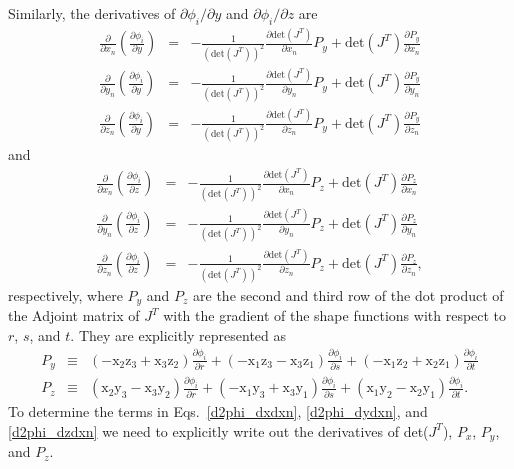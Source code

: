 Similarly, the derivatives of $\partial \phi_i/\partial y$ and $\partial \phi_i/ \partial z$ are 
%
\begin{eqnarray}
\frac{\partial}{\partial x_n} \left( \frac{\partial \phi_i}{\partial y} \right) &=&  -\frac{1}{(\text{det}(J^T))^2} \frac{\partial \text{det}(J^T)}{\partial x_n} P_y + \text{det}(J^T) \frac{\partial P_y}{\partial x_n}\nonumber\\
\frac{\partial}{\partial y_n} \left( \frac{\partial \phi_i}{\partial y} \right) &=& -\frac{1}{(\text{det}(J^T))^2} \frac{\partial \text{det}(J^T)}{\partial y_n} P_y + \text{det}(J^T) \frac{\partial P_y}{\partial y_n} \nonumber\\
\frac{\partial}{\partial z_n} \left( \frac{\partial \phi_i}{\partial y} \right) &=& -\frac{1}{(\text{det}(J^T))^2} \frac{\partial \text{det}(J^T)}{\partial z_n} P_y + \text{det}(J^T) \frac{\partial P_y}{\partial z_n} 
\label{d2phi_dydxn}
\end{eqnarray}
%
and
%
\begin{eqnarray}
\frac{\partial}{\partial x_n} \left( \frac{\partial \phi_i}{\partial z} \right) &=&  -\frac{1}{(\text{det}(J^T))^2} \frac{\partial \text{det}(J^T)}{\partial x_n} P_z + \text{det}(J^T) \frac{\partial P_z}{\partial x_n}\nonumber\\
\frac{\partial}{\partial y_n} \left( \frac{\partial \phi_i}{\partial z} \right) &=& -\frac{1}{(\text{det}(J^T))^2} \frac{\partial \text{det}(J^T)}{\partial y_n} P_z + \text{det}(J^T) \frac{\partial P_z}{\partial y_n} \nonumber\\
\frac{\partial}{\partial z_n} \left( \frac{\partial \phi_i}{\partial z} \right) &=& -\frac{1}{(\text{det}(J^T))^2} \frac{\partial \text{det}(J^T)}{\partial z_n} P_z + \text{det}(J^T) \frac{\partial P_z}{\partial z_n} ,
\label{d2phi_dzdxn}
\end{eqnarray}
%
respectively, where $P_y$ and $P_z$ are the second and third row of the dot product of the Adjoint matrix of $J^T$ with the gradient of the shape functions with respect to $r$, $s$, and $t$. They are explicitly represented as
%
\begin{eqnarray}
P_y &\equiv& \left(-\text{x}_2 \text{z}_3 + \text{x}_3 \text{z}_2\right) \frac{\partial \phi_i}{\partial r} + \left(-\text{x}_1 \text{z}_3 - \text{x}_3 \text{z}_1\right) \frac{\partial \phi_i}{\partial s} + \left(-\text{x}_1 \text{z}_2 + \text{x}_2 \text{z}_1\right) \frac{\partial \phi_i}{\partial t} \nonumber\\
%
P_z &\equiv& \left(\text{x}_2 \text{y}_3 - \text{x}_3 \text{y}_2\right) \frac{\partial \phi_i}{\partial r} + \left(-\text{x}_1 \text{y}_3 + \text{x}_3 \text{y}_1\right) \frac{\partial \phi_i}{\partial s} + \left(\text{x}_1 \text{y}_2 - \text{x}_2 \text{y}_1\right) \frac{\partial \phi_i}{\partial t}.
%
\label{Py_and_Pz}
\end{eqnarray}
%
To determine the terms in Eqs.\ \eqref{d2phi_dxdxn}, \eqref{d2phi_dydxn}, and \eqref{d2phi_dzdxn} we need to explicitly write out the derivatives of det($J^T$), $P_x$, $P_y$, and $P_z$. 

